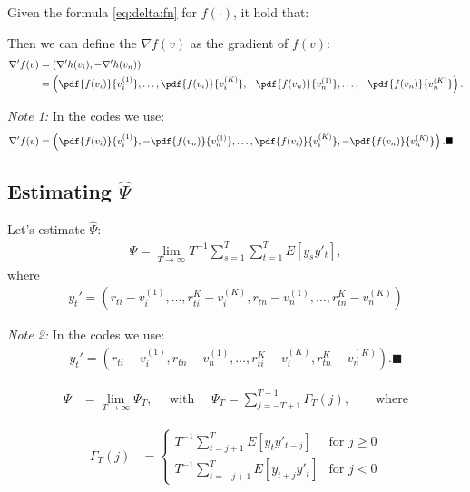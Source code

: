 \documentclass[12pt,oneside,a4paper]{article}
\begin{document}
Given  the formula \eqref{eq:delta:fn} for $f(\cdot)$, it hold that:

Then we can define the $\nabla f(v)$ as the gradient of $f(v)$:
\begin{align*}
\nabla' f(v) &=
\left( 	\nabla'h(v_{i}),  - \nabla'h(v_{n}) \right) \\ &=
\left( 
\pdf{f(v_{i})}{v_{i}^{(1)}},
\dots,
\pdf{f(v_{i})}{v_{i}^{(K)}},
-\pdf{f(v_{n})}{v_{n}^{(1)}},
\dots,
-\pdf{f(v_{n})}{v_{n}^{(K)}}
\right).
\end{align*}

\textit{Note 1:} In the codes we use:
\begin{align*}
\nabla' f(v) &=
\left( 
\pdf{f(v_{i})}{v_{i}^{(1)}},
-\pdf{f(v_{n})}{v_{n}^{(1)}},
\dots ,
\pdf{f(v_{i})}{v_{i}^{(K)}},
-\pdf{f(v_{n})}{v_{n}^{(K)}}
\right).
\blacksquare
\end{align*}  

\subsection{Estimating $\hat{\Psi}$}

Let's estimate $\hat{\Psi}$:
\begin{align*}
\Psi = \lim_{T \to \infty} T^{-1} \sum_{s=1}^{T}\sum_{t=1}^{T} E[y_{s}y'_{t}],
\end{align*}
where
\begin{align*}
y_{t}' = 
\left(
r_{ti} - v_{i}^{(1)}, \dots , r_{ti}^K - v_{i}^{(K)},
r_{tn} - v_{n}^{(1)}, \dots , r_{tn}^K - v_{n}^{(K)} 
\right)
\end{align*}

\textit{Note 2:} In the codes we use:
\begin{align*}
y_{t}' = 
\left(
r_{ti} - v_{i}^{(1)}, r_{tn} - v_{n}^{(1)}, \dots,
r_{ti}^K - v_{i}^{(K)}, r_{tn}^K - v_{n}^{(K)} 
\right).
\blacksquare
\end{align*}

\begin{align*}
	\Psi &= \lim_{T \to \infty} \Psi_{T},
	\quad \text{ with } \quad
	\Psi_{T} = \sum_{j=-T+1}^{T-1} \Gamma_{T}(j),
	\qquad \text{where}
\end{align*}

\begin{align*}
\Gamma_{T}(j) &=
\begin{cases}
T^{-1} \sum_{t=j+1}^{T}	E[y_{t}y'_{t-j}] & \text{for } j \geq 0
\\
T^{-1} \sum_{t=-j+1}^{T} E[y_{t+j}y'_{t}]& \text{for } j<0
\end{cases}
\end{align*}
\end{document}
